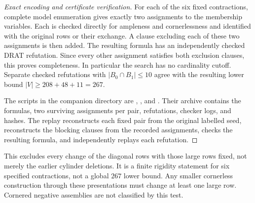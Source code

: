 \documentclass[11pt]{article}
\numberwithin{equation}{section}
\theoremstyle{definition}
\theoremstyle{remark}
\begin{document}
\begin{proof}[Exact encoding and certificate verification]
For each of the six fixed contractions, complete model enumeration gives
exactly two assignments to the membership variables. Each is checked
directly for ampleness and cornerlessness and identified with the original
rows or their exchange. A clause excluding each of these two assignments
is then added. The resulting formula has an independently checked DRAT
refutation. Since every other assignment satisfies both exclusion clauses,
this proves completeness. In particular the search has no cardinality
cutoff. Separate checked refutations with $|B_0\cap B_1|\le10$ agree
with the resulting lower bound $|V|\ge208+48+11=267$.

The scripts in the companion directory
 are
, ,
and . Their
 archive contains the formulas, two
surviving assignments per pair, refutations, checker logs, and hashes.
The replay reconstructs each fixed pair from the original labelled seed,
reconstructs the blocking clauses from the recorded assignments, checks
the resulting formula, and independently replays each refutation.
\end{proof}

This excludes every change of the diagonal rows with those large rows
fixed, not merely the earlier cylinder deletions. It is a finite rigidity
statement for six specified contractions, not a global $267$ lower bound.
Any smaller cornerless construction through these presentations must
change at least one large row. Cornered negative assemblies are not
classified by this test.
\end{document}
